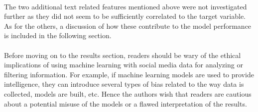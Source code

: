 \documentclass[11pt]{article}
\begin{document}
\\
The two additional text related features mentioned above were not investigated further as they did not seem to be sufficiently correlated to the target variable. As for the others, a discussion of how these contribute to the model performance is included in the following section.\\
\\
Before moving on to the results section, readers should be wary of the ethical implications of using machine learning with social media data for analyzing or filtering information. For example, if machine learning models are used to provide intelligence, they can introduce several types of bias related to the way data is collected, models are built, etc. Hence the authors wish that readers are cautious about a potential misuse of the models or a flawed interpretation of the results. \\
\end{document}

